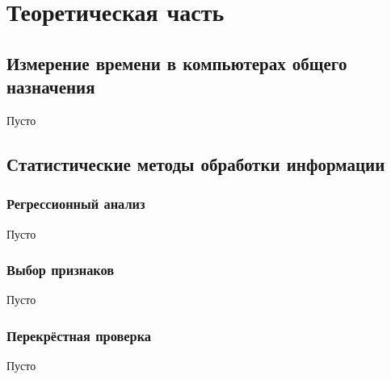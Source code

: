 \section{Теоретическая часть}
\subsection{Измерение времени в компьютерах общего назначения}
Пусто

\subsection{Статистические методы обработки информации}
\subsubsection{Регрессионный анализ}
Пусто

\subsubsection{Выбор признаков}
Пусто

\subsubsection{Перекрёстная проверка}
Пусто
